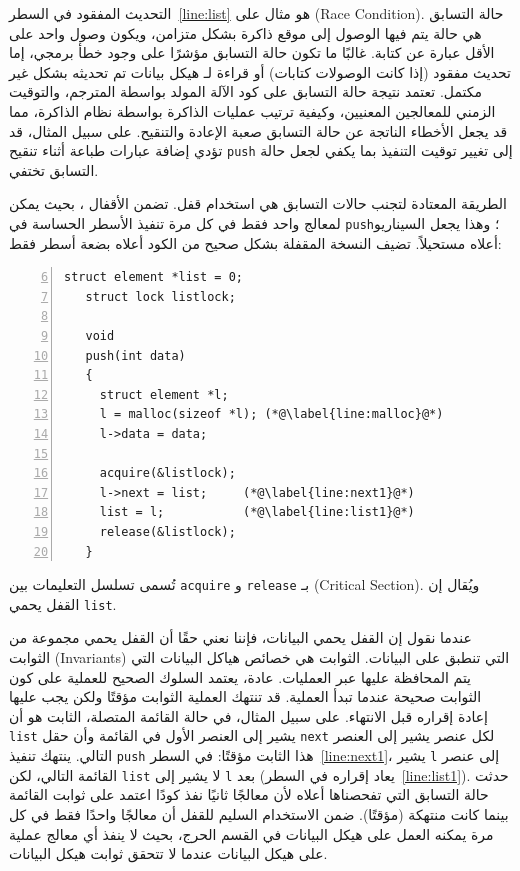 التحديث المفقود في السطر~\ref{line:list} هو مثال على  (Race Condition).
حالة التسابق هي حالة يتم فيها الوصول إلى موقع ذاكرة بشكل متزامن، ويكون وصول واحد على الأقل عبارة عن كتابة.
غالبًا ما تكون حالة التسابق مؤشرًا على وجود خطأ برمجي، إما تحديث مفقود (إذا كانت الوصولات كتابات) أو قراءة لـ هيكل بيانات تم تحديثه بشكل غير مكتمل.
تعتمد نتيجة حالة التسابق على كود الآلة المولد بواسطة المترجم، والتوقيت الزمني للمعالجين المعنيين، وكيفية ترتيب عمليات الذاكرة بواسطة نظام الذاكرة،
مما قد يجعل الأخطاء الناتجة عن حالة التسابق صعبة الإعادة والتنقيح.
على سبيل المثال، قد تؤدي إضافة عبارات طباعة أثناء تنقيح \lstinline{push} إلى تغيير توقيت التنفيذ بما يكفي لجعل حالة التسابق تختفي.

الطريقة المعتادة لتجنب حالات التسابق هي استخدام قفل.
تضمن الأقفال ، بحيث يمكن لمعالج واحد فقط في كل مرة تنفيذ الأسطر الحساسة في \lstinline{push}؛
وهذا يجعل السيناريو أعلاه مستحيلاً.
تضيف النسخة المقفلة بشكل صحيح من الكود أعلاه بضعة أسطر فقط:
\begin{lstlisting}[numbers=left,firstnumber=6]
   struct element *list = 0;
   struct lock listlock;
    	
   void
   push(int data)
   {
     struct element *l;
     l = malloc(sizeof *l); (*@\label{line:malloc}@*)
     l->data = data;
   
     acquire(&listlock);
     l->next = list;     (*@\label{line:next1}@*)
     list = l;           (*@\label{line:list1}@*)
     release(&listlock);
   }
\end{lstlisting}

تُسمى تسلسل التعليمات بين \lstinline{acquire} و \lstinline{release} بـ  (Critical Section).
ويُقال إن القفل يحمي \lstinline{list}.

عندما نقول إن القفل يحمي البيانات، فإننا نعني حقًا أن القفل يحمي مجموعة من الثوابت (Invariants) التي تنطبق على البيانات.
الثوابت هي خصائص هياكل البيانات التي يتم المحافظة عليها عبر العمليات.
عادة، يعتمد السلوك الصحيح للعملية على كون الثوابت صحيحة عندما تبدأ العملية.
قد تنتهك العملية الثوابت مؤقتًا ولكن يجب عليها إعادة إقراره قبل الانتهاء.
على سبيل المثال، في حالة القائمة المتصلة، الثابت هو أن \lstinline{list} يشير إلى العنصر الأول في القائمة وأن حقل \lstinline{next} لكل عنصر يشير إلى العنصر التالي.
ينتهك تنفيذ \lstinline{push} هذا الثابت مؤقتًا: في السطر~\ref{line:next1}، يشير \lstinline{l} إلى عنصر القائمة التالي، لكن \lstinline{list} لا يشير إلى \lstinline{l} بعد (يعاد إقراره في السطر~\ref{line:list1}).
حدثت حالة التسابق التي تفحصناها أعلاه لأن معالجًا ثانيًا نفذ كودًا اعتمد على ثوابت القائمة بينما كانت منتهكة (مؤقتًا).
ضمن الاستخدام السليم للقفل أن معالجًا واحدًا فقط في كل مرة يمكنه العمل على هيكل البيانات في القسم الحرج، بحيث لا ينفذ أي معالج عملية على هيكل البيانات عندما لا تتحقق ثوابت هيكل البيانات.


